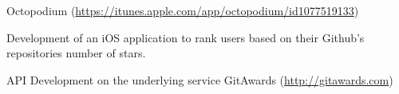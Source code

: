 

\begin{cventries}

  \cventry
    {} %
    {Octopodium (\url{https://itunes.apple.com/app/octopodium/id1077519133}) } %
    {} %
    {} %
    {
      \begin{cvitems} %
      	\item{Development of an iOS application to rank users based on their Github's repositories number of stars.}
        \item {API Development on the underlying service GitAwards (\url{http://gitawards.com})}
      \end{cvitems}
    }


\end{cventries}
